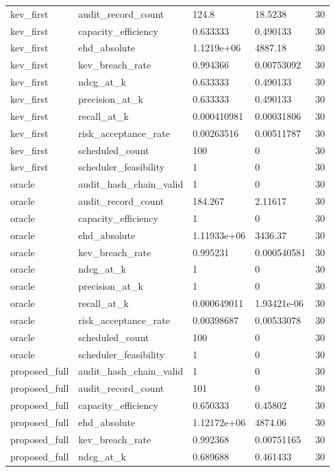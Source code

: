 \begin{tabular}{l l l l l}
kev\_first & audit\_record\_count & 124.8 & 18.5238 & 30 \\
kev\_first & capacity\_efficiency & 0.633333 & 0.490133 & 30 \\
kev\_first & ehd\_absolute & 1.1219e+06 & 4887.18 & 30 \\
kev\_first & kev\_breach\_rate & 0.994366 & 0.00753092 & 30 \\
kev\_first & ndcg\_at\_k & 0.633333 & 0.490133 & 30 \\
kev\_first & precision\_at\_k & 0.633333 & 0.490133 & 30 \\
kev\_first & recall\_at\_k & 0.000410981 & 0.00031806 & 30 \\
kev\_first & risk\_acceptance\_rate & 0.00263516 & 0.00511787 & 30 \\
kev\_first & scheduled\_count & 100 & 0 & 30 \\
kev\_first & scheduler\_feasibility & 1 & 0 & 30 \\
oracle & audit\_hash\_chain\_valid & 1 & 0 & 30 \\
oracle & audit\_record\_count & 184.267 & 2.11617 & 30 \\
oracle & capacity\_efficiency & 1 & 0 & 30 \\
oracle & ehd\_absolute & 1.11933e+06 & 3436.37 & 30 \\
oracle & kev\_breach\_rate & 0.995231 & 0.000540581 & 30 \\
oracle & ndcg\_at\_k & 1 & 0 & 30 \\
oracle & precision\_at\_k & 1 & 0 & 30 \\
oracle & recall\_at\_k & 0.000649011 & 1.93421e-06 & 30 \\
oracle & risk\_acceptance\_rate & 0.00398687 & 0.00533078 & 30 \\
oracle & scheduled\_count & 100 & 0 & 30 \\
oracle & scheduler\_feasibility & 1 & 0 & 30 \\
proposed\_full & audit\_hash\_chain\_valid & 1 & 0 & 30 \\
proposed\_full & audit\_record\_count & 101 & 0 & 30 \\
proposed\_full & capacity\_efficiency & 0.650333 & 0.45802 & 30 \\
proposed\_full & ehd\_absolute & 1.12172e+06 & 4874.06 & 30 \\
proposed\_full & kev\_breach\_rate & 0.992368 & 0.00751165 & 30 \\
proposed\_full & ndcg\_at\_k & 0.689688 & 0.461433 & 30 \\

\end{tabular}
